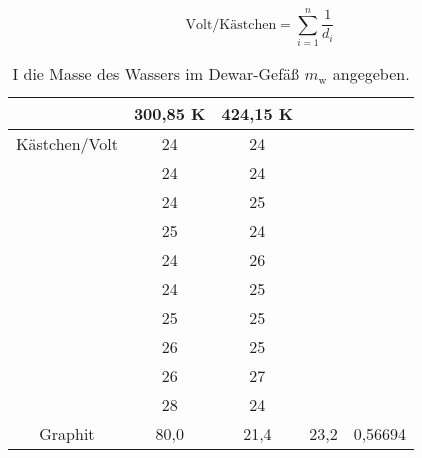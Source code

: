 \documentclass[titlepage = firstcover]{scrartcl}
\begin{document}
            \begin{equation*}
                \text{Volt/Kästchen} = \sum_{i=1}^{n} \frac{1}{d_i}
            \end{equation*}

            \begin{table}[h]
                \centering
                \caption{I die Masse des Wassers im Dewar-Gefäß $m_{\text{w}}$ angegeben.}
                \label{tab:Tabelle1}

                \begin{tabular}{c c c c c}
                    \toprule
                    {} & {300,85 K} & {424,15 K} \\
                    \midrule
                    Kästchen/Volt & 24 & 24 \\
                                  & 24 & 24 \\
                                  & 24 & 25 \\
                                  & 25 & 24 \\
                                  & 24 & 26 \\
                                  & 24 & 25 \\
                                  & 25 & 25 \\
                                  & 26 & 25 \\
                                  & 26 & 27 \\
                                  & 28 & 24 \\
                                  Graphit       & 80,0 & 21,4 & 23,2 & 0,56694 \\
                    \bottomrule
                \end{tabular}

            \end{table}
            
            
            
            


        
\end{document}
